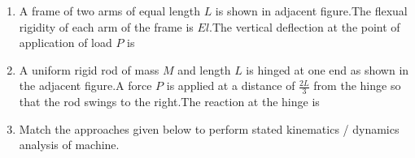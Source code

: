 \documentclass[journal]{IEEEtran}
\begin{document}
\begin{enumerate}
\begin{enumerate}
\end{enumerate}
\item A frame of two arms of equal length $L$ is shown in adjacent figure.The flexual rigidity of each arm of the frame is $El$.The vertical deflection at the point of application of load $P$ is
	\begin{figure}[H]
		\centering
		
	\end{figure}

\begin{enumerate}
\end{enumerate}
\item A uniform rigid rod of mass $M$ and length $L$ is hinged at one end as shown in the adjacent figure.A force $P$ is applied at a distance of $\frac{2L}{3}$ from the hinge so that the rod swings to the right.The reaction at the hinge is
	\begin{figure}[H]
		\centering
		
	\end{figure}
\begin{enumerate}
\end{enumerate}
\item Match the approaches given below to perform stated kinematics / dynamics analysis of machine.
\begin{table}[h!]
        \centering
  
\end{table}
\begin{enumerate}
\begin{multicols}{2}

\end{multicols}
\end{enumerate}
\end{enumerate}
\end{document}
